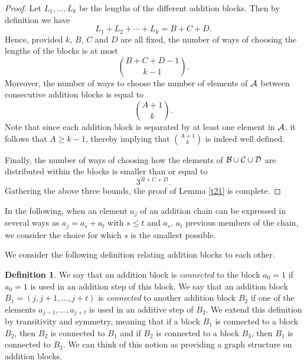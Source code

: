 \documentclass{article}
\theoremstyle{definition}
\newtheorem{definition}{Definition}[section]
\begin{document}
\begin{proof}
Let $L_1,\ldots, L_k$ be the lengths of the different addition blocks.  Then by definition we have
$$
L_1+L_2+\cdots+L_k=B+C+D.
$$
Hence, provided  $k$, $B$, $C$ and $D$ are all fixed, the number of ways of choosing the lengths of the blocks is at most
$$
{B+C+D-1\choose k-1}.
$$
Moreover, the number of ways to choose the number of elements of ${\cal A}$ between consecutive addition blocks is equal to
$$
{A+1\choose k}.
$$
Note that since each addition block is separated by at least one element in ${\cal A}$, it follows that  $A\ge k-1$, thereby implying that $\displaystyle{{A+1\choose k}}$ is indeed well defined.

Finally, the number of ways of choosing how the elements of ${\cal B}\cup {\cal C}\cup{\cal D}$ are distributed  within the blocks is smaller than or equal to
$$
3^{B+C+D}.
$$
Gathering the above three bounds, the proof of Lemma \ref{t21} is complete.
\end{proof}

In the following, when an element $a_j$ of an addition chain can be expressed in several ways as $a_j=a_s+a_t$ with $s\le t$ and $a_s,\, a_t$ previous members of the chain, we consider the choice for which $s$ is the smallest possible.

We consider the following definition relating addition blocks to each other.

\begin{definition} We say that an addition block is \emph{connected} to the block $a_0=1$ if $a_0=1$ is used in an addition step of this block.  We say that an addition block $B_1=(j,j+1,\ldots,j+t)$ is \emph{connected} to another addition block $B_2$ if one of the elements $a_{j-1},\ldots, a_{j+t}$ is used in an additive step of $B_2$. We extend this definition by transitivity and symmetry, meaning that if a block $B_1$ is connected to a block $B_2$, then $B_2$ is connected to $B_1$ and if $B_2$ is connected to a block $B_3$, then $B_1$ is connected to $B_3$. We can think of this notion as providing a graph structure on addition blocks.
\end{definition}


\end{document}
